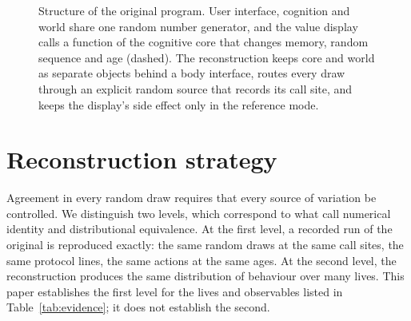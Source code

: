 \documentclass[preprint,12pt,authoryear]{elsarticle}
\newcommand{\code}[1]{\texttt{#1}}
\begin{document}
\begin{figure}[t]
\centering
{}
\caption{Structure of the original program. User interface, cognition and world share one random number generator, and the value display calls a function of the cognitive core that changes memory, random sequence and age (dashed). The reconstruction keeps core and world as separate objects behind a body interface, routes every draw through an explicit random source that records its call site, and keeps the display's side effect only in the reference mode.}
\label{fig:architecture}
\end{figure}

\section{Reconstruction strategy}

Agreement in every random draw requires that every source of variation be controlled. We distinguish two levels, which correspond to what \citet{axtell1996aligning} call numerical identity and distributional equivalence. At the first level, a recorded run of the original is reproduced exactly: the same random draws at the same call sites, the same protocol lines, the same actions at the same ages. At the second level, the reconstruction produces the same distribution of behaviour over many lives. This paper establishes the first level for the lives and observables listed in Table~\ref{tab:evidence}; it does not establish the second.
\end{document}

